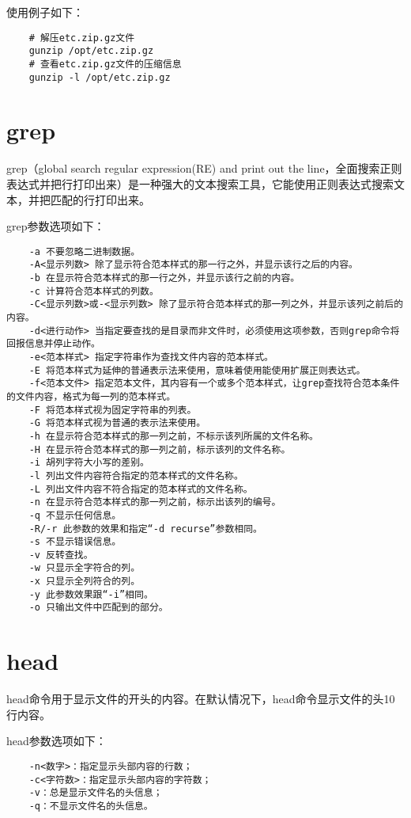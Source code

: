 \documentclass[a4paper,left=2.5cm,right=2.5cm,11pt]{article}
\begin{document}
	使用例子如下：
	\begin{lstlisting}
	# 解压etc.zip.gz文件
	gunzip /opt/etc.zip.gz
	# 查看etc.zip.gz文件的压缩信息
	gunzip -l /opt/etc.zip.gz
	\end{lstlisting}

\section{grep}
	grep（global search regular expression(RE) and print out the line，全面搜索正则表达式并把行打印出来）是一种强大的文本搜索工具，它能使用正则表达式搜索文本，并把匹配的行打印出来。

	grep参数选项如下：
	\begin{lstlisting}
	-a 不要忽略二进制数据。 
	-A<显示列数> 除了显示符合范本样式的那一行之外，并显示该行之后的内容。 
	-b 在显示符合范本样式的那一行之外，并显示该行之前的内容。 
	-c 计算符合范本样式的列数。 
	-C<显示列数>或-<显示列数> 除了显示符合范本样式的那一列之外，并显示该列之前后的内容。 
	-d<进行动作> 当指定要查找的是目录而非文件时，必须使用这项参数，否则grep命令将回报信息并停止动作。 
	-e<范本样式> 指定字符串作为查找文件内容的范本样式。 
	-E 将范本样式为延伸的普通表示法来使用，意味着使用能使用扩展正则表达式。 
	-f<范本文件> 指定范本文件，其内容有一个或多个范本样式，让grep查找符合范本条件的文件内容，格式为每一列的范本样式。 
	-F 将范本样式视为固定字符串的列表。 
	-G 将范本样式视为普通的表示法来使用。 
	-h 在显示符合范本样式的那一列之前，不标示该列所属的文件名称。 
	-H 在显示符合范本样式的那一列之前，标示该列的文件名称。 
	-i 胡列字符大小写的差别。 
	-l 列出文件内容符合指定的范本样式的文件名称。 
	-L 列出文件内容不符合指定的范本样式的文件名称。 
	-n 在显示符合范本样式的那一列之前，标示出该列的编号。 
	-q 不显示任何信息。 
	-R/-r 此参数的效果和指定“-d recurse”参数相同。 
	-s 不显示错误信息。 
	-v 反转查找。 
	-w 只显示全字符合的列。 
	-x 只显示全列符合的列。 
	-y 此参数效果跟“-i”相同。 
	-o 只输出文件中匹配到的部分。
	\end{lstlisting}

\section{head}
	head命令用于显示文件的开头的内容。在默认情况下，head命令显示文件的头10行内容。\par

	head参数选项如下：
	\begin{lstlisting}
	-n<数字>：指定显示头部内容的行数； 
	-c<字符数>：指定显示头部内容的字符数； 
	-v：总是显示文件名的头信息； 
	-q：不显示文件名的头信息。
	\end{lstlisting}
\end{document}
